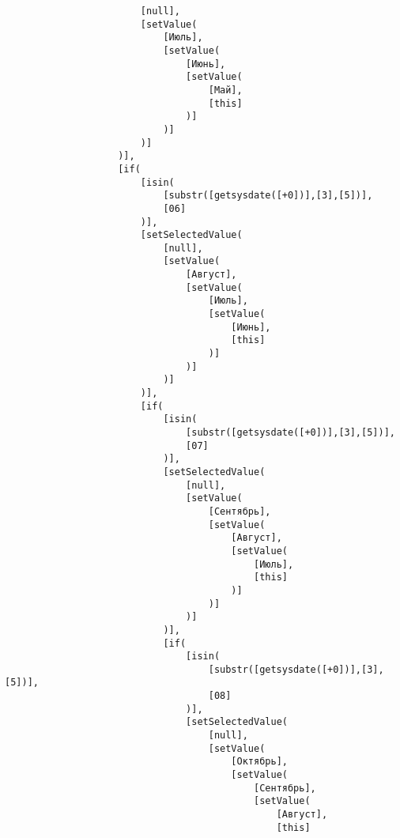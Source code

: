 \documentclass[../index.tex]{subfiles}
\begin{document}
\begin{verbatim}
                        [null],
                        [setValue(
                            [Июль],
                            [setValue(
                                [Июнь],
                                [setValue(
                                    [Май],
                                    [this]
                                )]
                            )]
                        )]
                    )],
                    [if(
                        [isin(
                            [substr([getsysdate([+0])],[3],[5])],
                            [06]
                        )],
                        [setSelectedValue(
                            [null],
                            [setValue(
                                [Август],
                                [setValue(
                                    [Июль],
                                    [setValue(
                                        [Июнь],
                                        [this]
                                    )]
                                )]
                            )]
                        )],
                        [if(
                            [isin(
                                [substr([getsysdate([+0])],[3],[5])],
                                [07]
                            )],
                            [setSelectedValue(
                                [null],
                                [setValue(
                                    [Сентябрь],
                                    [setValue(
                                        [Август],
                                        [setValue(
                                            [Июль],
                                            [this]
                                        )]
                                    )]
                                )]
                            )],
                            [if(
                                [isin(
                                    [substr([getsysdate([+0])],[3],[5])],
                                    [08]
                                )],
                                [setSelectedValue(
                                    [null],
                                    [setValue(
                                        [Октябрь],
                                        [setValue(
                                            [Сентябрь],
                                            [setValue(
                                                [Август],
                                                [this]

\end{verbatim}
\end{document}
